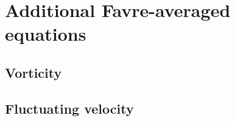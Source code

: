 \documentclass[oneside,a4paper,11pt]{report}
\begin{document}
\section{Additional Favre-averaged equations}

\subsection{Vorticity}

\subsection{Fluctuating velocity}
\end{document}
